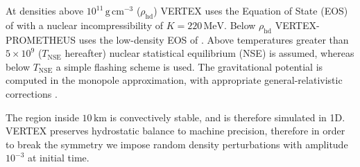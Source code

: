 \documentclass[fleqn,usenatbib]{mnras}
\newcommand{\gcc}{\text{g}\, \text{cm}^{-3}}
\newcommand{\vertexprom}{\textsc{V{\footnotesize ERTEX}-P{\footnotesize ROMETHEUS}}\xspace}
\newcommand{\vertex}{\textsc{V{\footnotesize ERTEX}}\xspace}
\begin{document}
At densities above $10^{11}\,\gcc$ ($\rho_{\text{hd}}$) \vertex uses  the Equation of State (EOS) of \cite{Lattimer1991} with a nuclear incompressibility of $K=220\, \text{MeV}$. Below $\rho_{\text{hd}}$ \vertexprom uses the low-density EOS of \cite{Janka1999}. Above  temperatures greater than $5\times10^{9}$ ($T_{\text{NSE}}$ hereafter) nuclear statistical equilibrium (NSE) is assumed, whereas below $T_{\text{NSE}}$ a simple flashing scheme is used. The gravitational potential is computed in the monopole approximation, with appropriate general-relativistic corrections \citet{Marek2006}.

The region inside $10\,\text{km}$ is convectively stable, and is therefore simulated in 1D. \vertex preserves hydrostatic balance to machine precision, therefore in order to break the symmetry we impose random density perturbations with amplitude $10^{-3}$ at initial time. 
\end{document}
